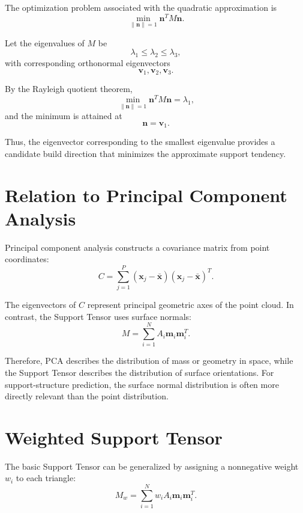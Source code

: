 \documentclass[11pt,a4paper]{article}
\begin{document}
The optimization problem associated with the quadratic approximation is
\begin{equation}
\min_{\|\bm n\|=1}
\bm n^T M \bm n.
\label{eq:rayleigh_problem}
\end{equation}

Let the eigenvalues of $M$ be
\[
\lambda_1 \leq \lambda_2 \leq \lambda_3,
\]
with corresponding orthonormal eigenvectors
\[
\bm v_1,\bm v_2,\bm v_3.
\]

By the Rayleigh quotient theorem,
\begin{equation}
\min_{\|\bm n\|=1}
\bm n^T M \bm n
=
\lambda_1,
\end{equation}
and the minimum is attained at
\begin{equation}
\bm n = \bm v_1.
\end{equation}

Thus, the eigenvector corresponding to the smallest eigenvalue provides a candidate build direction that minimizes the approximate support tendency.

\section{Relation to Principal Component Analysis}

Principal component analysis constructs a covariance matrix from point coordinates:
\begin{equation}
C
=
\sum_{j=1}^{P}
(\bm x_j-\bar{\bm x})
(\bm x_j-\bar{\bm x})^T.
\end{equation}

The eigenvectors of $C$ represent principal geometric axes of the point cloud.
In contrast, the Support Tensor uses surface normals:
\begin{equation}
M
=
\sum_{i=1}^{N}
A_i
\bm m_i\bm m_i^T.
\end{equation}

Therefore, PCA describes the distribution of mass or geometry in space, while the Support Tensor describes the distribution of surface orientations.
For support-structure prediction, the surface normal distribution is often more directly relevant than the point distribution.

\section{Weighted Support Tensor}

The basic Support Tensor can be generalized by assigning a nonnegative weight $w_i$ to each triangle:
\begin{equation}
M_w
=
\sum_{i=1}^{N}
w_i A_i
\bm m_i\bm m_i^T.
\label{eq:weighted_support_tensor}
\end{equation}
\end{document}
